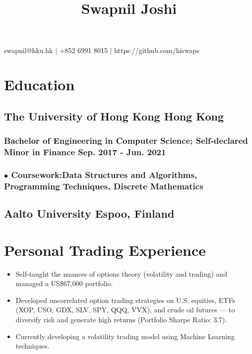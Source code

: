 \documentclass{article}
\makeatletter
\renewcommand{\maketitle}{

\begin{center}
{\huge\bfseries
\thetitle}

\vspace*{0.35cm}

swapnil@hku.hk | +852 6991 8015 | https://github.com/hiswaps

\end{center}
}
\makeatother
\begin{document}
\title{Swapnil Joshi}
\maketitle





\section{Education}
\subsection{The University of Hong Kong \hspace{4.12in} Hong Kong}
\subsubsection{Bachelor of Engineering in Computer Science; Self-declared Minor in Finance \hspace{1.29in} Sep. 2017 - Jun. 2021}

\subsubsection{$\bullet$ \textbf{Coursework:}Data Structures and Algorithms, Programming Techniques, Discrete Mathematics}



\subsection{Aalto University \hspace{4.8in} Espoo, Finland}


\section{Personal Trading Experience}

\begin{itemize}[noitemsep]
\item Self-taught the nuances of options theory (volatility and trading) and managed a US\$67,000 portfolio.
\item Developed uncorrelated option trading strategies on U.S. equities, ETFs (XOP, USO, GDX, SLV, SPY, QQQ, VVX), and crude oil futures — to diversify risk and generate high returns (Portfolio Sharpe Ratio: 3.7).
\item Currently developing a volatility trading model using Machine Learning techniques.
\end{itemize}
\end{document}
